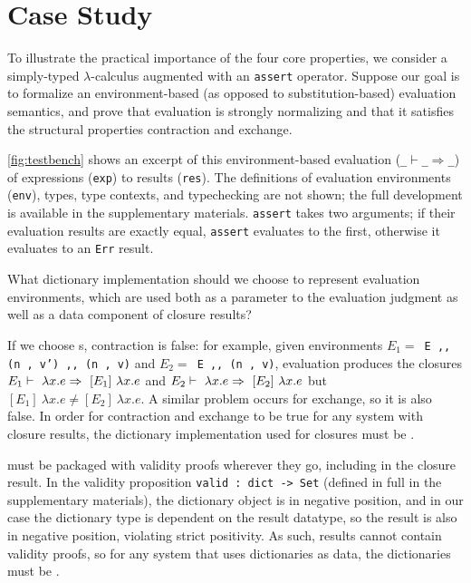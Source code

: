 \section{Case Study}
\label{sec:CaseStudy}



To illustrate the practical importance of the four core properties, we consider a simply-typed $\lambda$-calculus augmented with an \texttt{assert} operator.
%
Suppose our goal is to formalize an environment-based (as opposed to substitution-based) evaluation semantics,
%
and prove that evaluation is strongly normalizing and that it satisfies the structural properties contraction and exchange.

\autoref{fig:testbench} shows an excerpt of this environment-based evaluation (\texttt{\_$\vdash$\_$\Rightarrow$\_}) of expressions (\texttt{exp}) to results (\texttt{res}).
%
The definitions of evaluation environments (\texttt{env}), types, type contexts, and typechecking are not shown; the full development is available in the supplementary materials.
%
\texttt{assert} takes two arguments; if their evaluation results are exactly equal, \texttt{assert} evaluates to the first,
otherwise it evaluates to an \texttt{Err} result.

What dictionary implementation should we choose to represent evaluation environments,
which are used both as a parameter to the evaluation judgment as well as a data component of closure results?
%

If we choose \sal{}s, contraction is false:
%
for example, given environments
%
$E_1=$\ \texttt{E ,, (n , v') ,, (n , v)} and
%
$E_2=$\ \texttt{E ,, (n , v)},
%
evaluation produces the closures
%
$E_1 \vdash~\lambda x. e \Rightarrow~[E_1]\ \lambda x. e$
%
and
%
$E_2 \vdash~\lambda x. e \Rightarrow~[E_2]\ \lambda x. e$
%
but
%
$[E_1]\ \lambda x. e \neq [E_2]\ \lambda x. e$.
%
A similar problem occurs for exchange, so it is also false.
%
In order for contraction and exchange to be true for any system with closure results,
the dictionary implementation used for closures must be \extensional.

\Cals{} must be packaged with validity proofs wherever they go, including in the closure result.
In the validity proposition \texttt{valid : dict -> Set} (defined in full in the supplementary materials), the dictionary object is in negative position,
and in our case the dictionary type is dependent on the result datatype,
so the result is also in negative position, violating strict positivity.
As such, results cannot contain validity proofs, so for any system that uses dictionaries as data,
the dictionaries must be \total.

